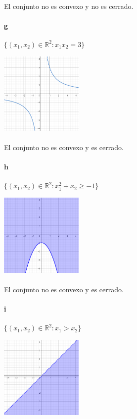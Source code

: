 \documentclass{article}
\begin{document}
	\paragraph{}El conjunto no es convexo y no es cerrado.
	\paragraph{g} $\{ (x_1, x_2) \in \mathbb{R}^2: x_1 x_2 = 3 \}$
	\begin{center}
		\includegraphics[width=0.3\textwidth]{g}
	\end{center}
	\paragraph{}El conjunto no es convexo y es cerrado.
	\paragraph{h} $\{ (x_1, x_2) \in \mathbb{R}^2: x^2_1 + x_2 \geq -1 \}$
	\begin{center}
		\includegraphics[width=0.3\textwidth]{h}
	\end{center}
	\paragraph{}El conjunto no es convexo y es cerrado.
	\newpage
	\paragraph{i} $\{ (x_1, x_2) \in \mathbb{R}^2: x_1 > x_2  \}$
	\begin{center}
		\includegraphics[width=0.3\textwidth]{i}
	\end{center}
\end{document}
